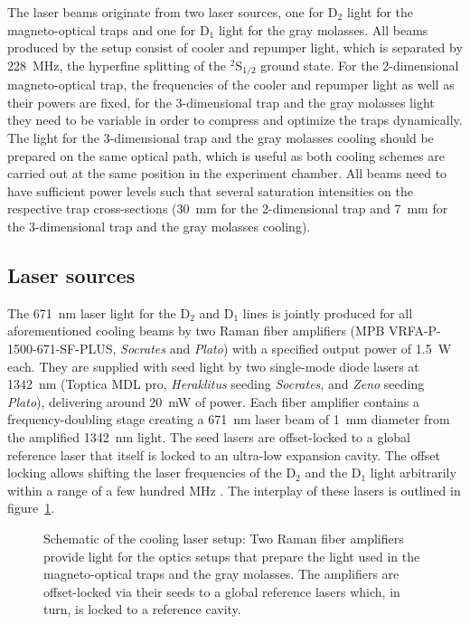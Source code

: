 The laser beams originate from two laser sources, one for D$_2$ light for the magneto-optical traps and one for D$_1$ light for the gray molasses. All beams produced by the setup consist of cooler and repumper light, which is separated by \SI{228}{\mega\hertz}, the hyperfine splitting of the $^2\text{S}_{1/2}$ ground state. For the 2-dimensional magneto-optical trap, the frequencies of the cooler and repumper light as well as their powers are fixed, for the 3-dimensional trap and the gray molasses light they need to be variable in order to compress and optimize the traps dynamically. The light for the 3-dimensional trap and the gray molasses cooling should be prepared on the same optical path, which is useful as both cooling schemes are carried out at the same position in the experiment chamber. All beams need to have sufficient power levels such that several saturation intensities on the respective trap cross-sections (\SI{30}{\milli\meter} for the 2-dimensional trap and \SI{7}{\milli\meter} for the 3-dimensional trap and the gray molasses cooling).

\subsection*{Laser sources}
The \SI{671}{\nano\meter} laser light for the D$_2$ and D$_1$ lines is jointly produced for all aforementioned cooling beams by two Raman fiber amplifiers (MPB VRFA-P-1500-671-SF-PLUS, \textit{Socrates} and \textit{Plato}) with a specified output power of \SI{1.5}{\watt} each. They are supplied with seed light by two single-mode diode lasers at \SI{1342}{\nano\meter} (Toptica MDL pro, \textit{Heraklitus} seeding \textit{Socrates}, and \textit{Zeno} seeding \textit{Plato}), delivering around \SI{20}{\milli\watt} of power. Each fiber amplifier contains a frequency-doubling stage creating a \SI{671}{\nano\meter} laser beam of \SI{1}{\milli\meter} diameter from the amplified \SI{1342}{\nano\meter} light. The seed lasers are offset-locked to a global reference laser that itself is locked to an ultra-low expansion cavity. The offset locking allows shifting the laser frequencies of the D$_2$ and the D$_1$ light arbitrarily within a range of a few hundred \si{\mega\hertz} . The interplay of these lasers is outlined in figure~\ref{fig:laser_interplay_schematic}.

\begin{figure}
    \caption{Schematic of the cooling laser setup: Two Raman fiber amplifiers provide light for the optics setups that prepare the light used in the magneto-optical traps and the gray molasses. The amplifiers are offset-locked via their seeds to a global reference lasers which, in turn, is locked to a reference cavity.
    }\label{fig:laser_interplay_schematic}
\end{figure}


